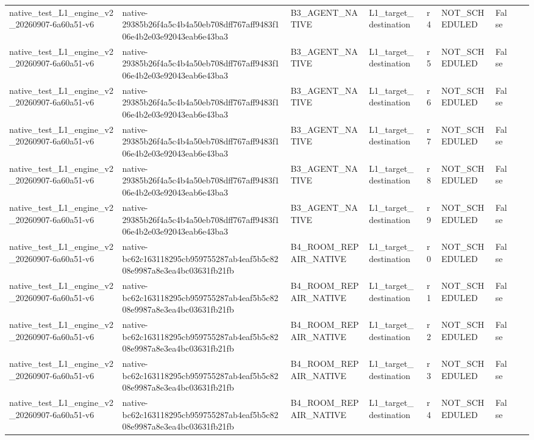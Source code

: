 \begin{tabular}{lllllllll}
native\_test\_L1\_engine\_v2\_20260907-6a60a51-v6 & native-29385b26f4a5c4b4a50eb708dff767aff9483f106e4b2e03e92043eab6e43ba3 & B3\_AGENT\_NATIVE & L1\_target\_destination & r4 & NOT\_SCHEDULED & False &  &  \\
native\_test\_L1\_engine\_v2\_20260907-6a60a51-v6 & native-29385b26f4a5c4b4a50eb708dff767aff9483f106e4b2e03e92043eab6e43ba3 & B3\_AGENT\_NATIVE & L1\_target\_destination & r5 & NOT\_SCHEDULED & False &  &  \\
native\_test\_L1\_engine\_v2\_20260907-6a60a51-v6 & native-29385b26f4a5c4b4a50eb708dff767aff9483f106e4b2e03e92043eab6e43ba3 & B3\_AGENT\_NATIVE & L1\_target\_destination & r6 & NOT\_SCHEDULED & False &  &  \\
native\_test\_L1\_engine\_v2\_20260907-6a60a51-v6 & native-29385b26f4a5c4b4a50eb708dff767aff9483f106e4b2e03e92043eab6e43ba3 & B3\_AGENT\_NATIVE & L1\_target\_destination & r7 & NOT\_SCHEDULED & False &  &  \\
native\_test\_L1\_engine\_v2\_20260907-6a60a51-v6 & native-29385b26f4a5c4b4a50eb708dff767aff9483f106e4b2e03e92043eab6e43ba3 & B3\_AGENT\_NATIVE & L1\_target\_destination & r8 & NOT\_SCHEDULED & False &  &  \\
native\_test\_L1\_engine\_v2\_20260907-6a60a51-v6 & native-29385b26f4a5c4b4a50eb708dff767aff9483f106e4b2e03e92043eab6e43ba3 & B3\_AGENT\_NATIVE & L1\_target\_destination & r9 & NOT\_SCHEDULED & False &  &  \\
native\_test\_L1\_engine\_v2\_20260907-6a60a51-v6 & native-bc62c163118295cb959755287ab4eaf5b5c8208e9987a8e3ea4bc03631fb21fb & B4\_ROOM\_REPAIR\_NATIVE & L1\_target\_destination & r0 & NOT\_SCHEDULED & False &  &  \\
native\_test\_L1\_engine\_v2\_20260907-6a60a51-v6 & native-bc62c163118295cb959755287ab4eaf5b5c8208e9987a8e3ea4bc03631fb21fb & B4\_ROOM\_REPAIR\_NATIVE & L1\_target\_destination & r1 & NOT\_SCHEDULED & False &  &  \\
native\_test\_L1\_engine\_v2\_20260907-6a60a51-v6 & native-bc62c163118295cb959755287ab4eaf5b5c8208e9987a8e3ea4bc03631fb21fb & B4\_ROOM\_REPAIR\_NATIVE & L1\_target\_destination & r2 & NOT\_SCHEDULED & False &  &  \\
native\_test\_L1\_engine\_v2\_20260907-6a60a51-v6 & native-bc62c163118295cb959755287ab4eaf5b5c8208e9987a8e3ea4bc03631fb21fb & B4\_ROOM\_REPAIR\_NATIVE & L1\_target\_destination & r3 & NOT\_SCHEDULED & False &  &  \\
native\_test\_L1\_engine\_v2\_20260907-6a60a51-v6 & native-bc62c163118295cb959755287ab4eaf5b5c8208e9987a8e3ea4bc03631fb21fb & B4\_ROOM\_REPAIR\_NATIVE & L1\_target\_destination & r4 & NOT\_SCHEDULED & False &  &  \\

\end{tabular}
